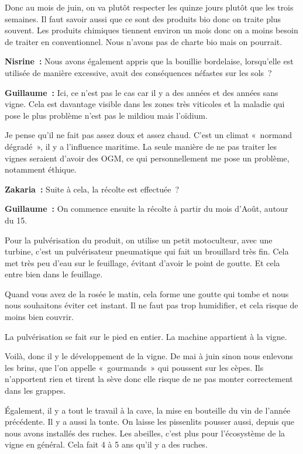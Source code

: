 \documentclass[a4paper, titlepage]{report}
\begin{document}
Donc au mois de juin, on va plutôt respecter les quinze jours plutôt que
les trois semaines. Il faut savoir aussi que ce sont des produits bio
donc on traite plus souvent. Les produits chimiques tiennent environ un
mois donc on a moins besoin de traiter en conventionnel. Nous n'avons
pas de charte bio mais on pourrait.

\textbf{Nisrine~:} Nous avons également appris que la bouillie
bordelaise, lorsqu'elle est utilisée de manière excessive, avait des
conséquences néfastes sur les sols~?

\textbf{Guillaume~:} Ici, ce n'est pas le cas car il y a des années et
des années sans vigne. Cela est davantage visible dans les zones très
viticoles et la maladie qui pose le plus problème n'est pas le mildiou
mais l'oïdium.

Je pense qu'il ne fait pas assez doux et assez chaud. C'est un climat
«~normand dégradé~», il y a l'influence maritime. La seule manière de ne
pas traiter les vignes seraient d'avoir des OGM, ce qui personnellement
me pose un problème, notamment éthique.

\textbf{Zakaria~:} Suite à cela, la récolte est effectuée~?

\textbf{Guillaume~:} On commence ensuite la récolte à partir du mois
d'Août, autour du 15.

Pour la pulvérisation du produit, on utilise un petit motoculteur, avec
une turbine, c'est un pulvérisateur pneumatique qui fait un brouillard
très fin. Cela met très peu d'eau sur le feuillage, évitant d'avoir le
point de goutte. Et cela entre bien dans le feuillage.

Quand vous avez de la rosée le matin, cela forme une goutte qui tombe et
nous nous souhaitons éviter cet instant. Il ne faut pas trop humidifier,
et cela risque de moins bien couvrir.

La pulvérisation se fait sur le pied en entier. La machine appartient à
la vigne.

Voilà, donc il y le développement de la vigne. De mai à juin sinon nous
enlevons les brins, que l'on appelle «~gourmands~» qui poussent sur les
cèpes. Ils n'apportent rien et tirent la sève donc elle risque de ne pas
monter correctement dans les grappes.

Également, il y a tout le travail à la cave, la mise en bouteille du vin
de l'année précédente. Il y a aussi la tonte. On laisse les pissenlits
pousser aussi, depuis que nous avons installés des ruches. Les abeilles,
c'est plus pour l'écosystème de la vigne en général. Cela fait 4 à 5 ans
qu'il y a des ruches.
\end{document}
